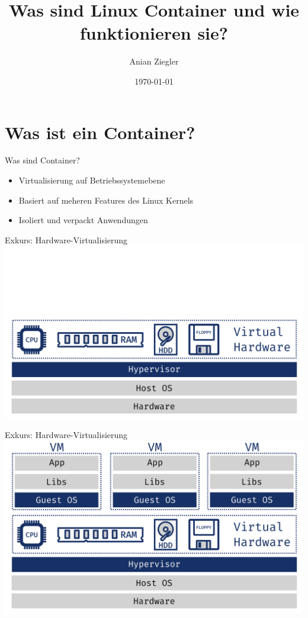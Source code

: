 \documentclass{beamer}
\title{Was sind Linux Container und wie funktionieren sie?}
\date{\today}
\author{Anian Ziegler}
\institute{cioplenu}
\begin{document}
  \maketitle
  \section{Was ist ein Container?}
  \begin{frame}{Was sind Container?}
    \begin{itemize}[<+->]
      \item \alert<4>{Virtualisierung auf Betriebssystemebene}
      \item Basiert auf meheren Features des Linux Kernels
      \item Isoliert und verpackt Anwendungen
    \end{itemize}
  \end{frame}
  
  \begin{frame}{Exkurs: Hardware-Virtualisierung}
    \includegraphics[width=\textwidth]{hypervisor}
  \end{frame}
  \begin{frame}{Exkurs: Hardware-Virtualisierung}
    \includegraphics[width=\textwidth]{vms}
  \end{frame}
  
\end{document}
